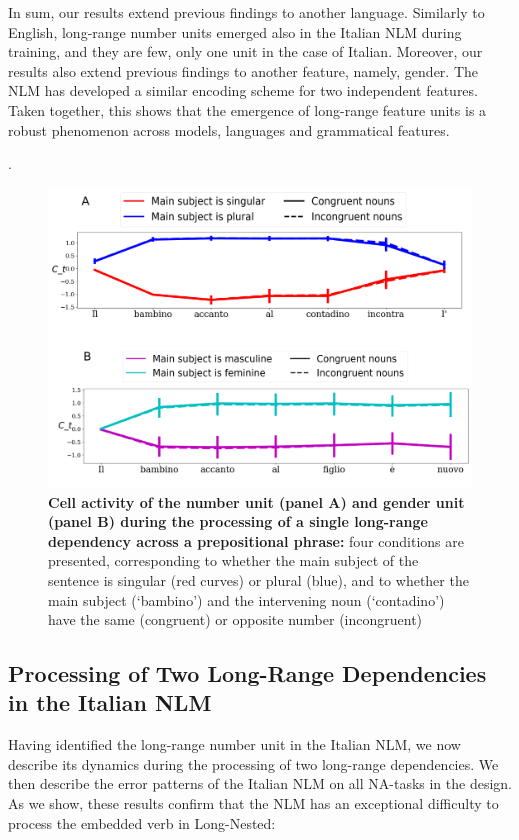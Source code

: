 \vspace{10pt}

In sum, our results extend previous findings to another language. Similarly to English, long-range number units emerged also in the Italian NLM during training, and they are few, only one unit in the case of Italian. Moreover, our results also extend previous findings to another feature, namely, gender. The NLM has developed a similar encoding scheme for two independent features. Taken together, this shows that the emergence of long-range feature units is a robust phenomenon across models, languages and grammatical features. 

. 

\begin{figure}
    \centering
    \includegraphics[width=\textwidth]{figures/model_activations_nounpp.png}
    \caption{\textbf{Cell activity of the number unit (panel A) and gender unit (panel B) during the processing of a single long-range dependency across a prepositional phrase:} four conditions are presented, corresponding to whether the main subject of the sentence is singular (red curves) or plural (blue), and to whether the main subject (`bambino') and the intervening noun (`contadino') have the same (congruent) or opposite number (incongruent)}
    \label{fig:nounpp}
\end{figure} 

\subsection{Processing of Two Long-Range Dependencies in the Italian NLM}
Having identified the long-range number unit in the Italian NLM, we now describe its dynamics during the processing of two long-range dependencies. We then describe the error patterns of the Italian NLM on all NA-tasks in the design. As we show, these results confirm that the NLM has an exceptional difficulty to process the embedded verb in Long-Nested:

